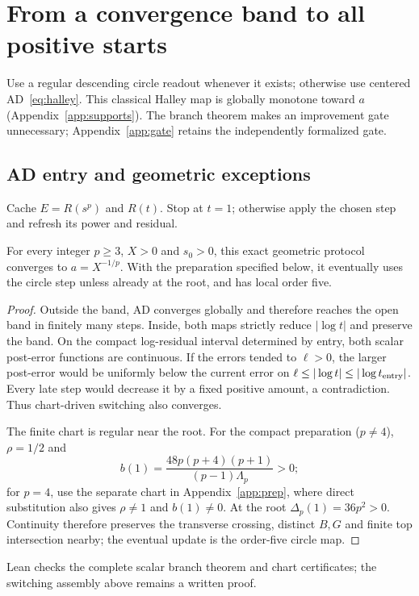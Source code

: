 \documentclass[11pt,a4paper]{article}
\begin{document}
\clearpage
\section{From a convergence band to all positive starts}\label{sec:safeguard}
Use a regular descending circle readout whenever it exists; otherwise use centered AD~\eqref{eq:halley}. This classical Halley map is globally monotone toward $a$ (Appendix~\ref{app:supports}). The branch theorem makes an improvement gate unnecessary; Appendix~\ref{app:gate} retains the independently formalized gate.

\subsection{AD entry and geometric exceptions}
Cache $E=R(s^p)$ and $R(t)$. Stop at $t=1$; otherwise apply the chosen step and refresh its power and residual.

\begin{proposition}\label{thm:entry}
For every integer $p\ge3$, $X>0$ and $s_0>0$, this exact geometric protocol converges to $a=X^{-1/p}$. With the preparation specified below, it eventually uses the circle step unless already at the root, and has local order five.
\end{proposition}
\begin{proof}
Outside the band, AD converges globally and therefore reaches the open band in finitely many steps. Inside, both maps strictly reduce $|\log t|$ and preserve the band. On the compact log-residual interval determined by entry, both scalar post-error functions are continuous. If the errors tended to $\ell>0$, the larger post-error would be uniformly below the current error on $\ell\le|\log t|\le|\log t_{\rm entry}|$. Every late step would decrease it by a fixed positive amount, a contradiction. Thus chart-driven switching also converges.

The finite chart is regular near the root. For the compact preparation ($p\ne4$), $\rho=1/2$ and
\[
 b(1)=\frac{48p(p+4)(p+1)}{(p-1)\Lambda_p}>0;
\]
for $p=4$, use the separate chart in Appendix~\ref{app:prep}, where direct substitution also gives $\rho\ne1$ and $b(1)\ne0$. At the root $\Delta_p(1)=36p^2>0$. Continuity therefore preserves the transverse crossing, distinct $B,G$ and finite top intersection nearby; the eventual update is the order-five circle map.
\end{proof}
Lean checks the complete scalar branch theorem and chart certificates; the switching assembly above remains a written proof.
\end{document}
